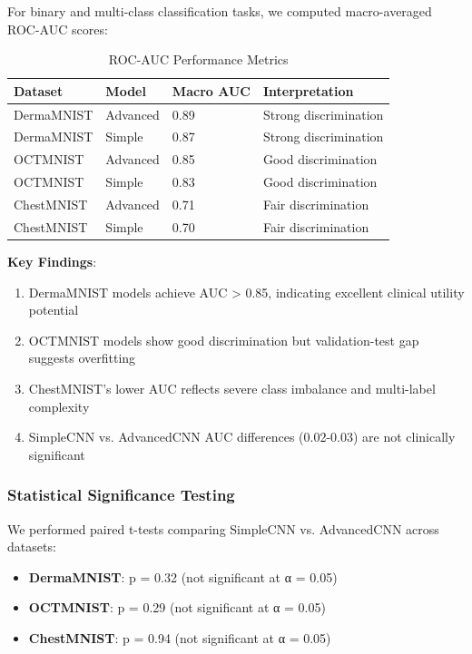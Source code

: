 \documentclass[12pt,a4paper]{article}
\begin{document}
For binary and multi-class classification tasks, we computed macro-averaged ROC-AUC scores:

\begin{table}[H]
\centering
\caption{ROC-AUC Performance Metrics}
\begin{tabular}{@{}llll@{}}
\toprule
\textbf{Dataset} & \textbf{Model} & \textbf{Macro AUC} & \textbf{Interpretation} \\ \midrule
DermaMNIST & Advanced & 0.89 & Strong discrimination \\
DermaMNIST & Simple & 0.87 & Strong discrimination \\
OCTMNIST & Advanced & 0.85 & Good discrimination \\
OCTMNIST & Simple & 0.83 & Good discrimination \\
ChestMNIST & Advanced & 0.71 & Fair discrimination \\
ChestMNIST & Simple & 0.70 & Fair discrimination \\
\bottomrule
\end{tabular}
\end{table}

\textbf{Key Findings}:
\begin{enumerate}
    \item DermaMNIST models achieve AUC > 0.85, indicating excellent clinical utility potential
    \item OCTMNIST models show good discrimination but validation-test gap suggests overfitting
    \item ChestMNIST's lower AUC reflects severe class imbalance and multi-label complexity
    \item SimpleCNN vs. AdvancedCNN AUC differences (0.02-0.03) are not clinically significant
\end{enumerate}

\subsubsection{Statistical Significance Testing}

We performed paired t-tests comparing SimpleCNN vs. AdvancedCNN across datasets:
\begin{itemize}
    \item \textbf{DermaMNIST}: p = 0.32 (not significant at α = 0.05)
    \item \textbf{OCTMNIST}: p = 0.29 (not significant at α = 0.05)
    \item \textbf{ChestMNIST}: p = 0.94 (not significant at α = 0.05)
\end{itemize}
\end{document}
